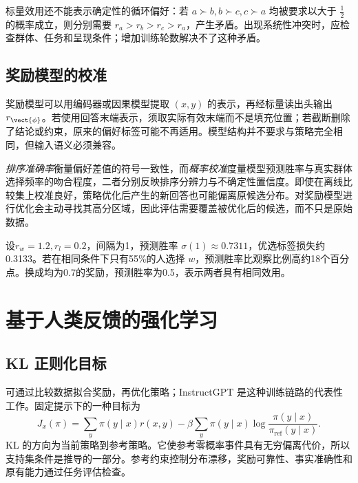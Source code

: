\documentclass[../textbook.tex]{subfiles}
\begin{document}
标量效用还不能表示确定性的循环偏好：若 $a\succ b,b\succ c,c\succ a$ 均被要求以大于 $\frac{1}{2}$ 的概率成立，则分别需要 $r_a>r_b>r_c>r_a$，产生矛盾。出现系统性冲突时，应检查群体、任务和呈现条件；增加训练轮数解决不了这种矛盾。

\subsection{奖励模型的校准}
奖励模型可以用编码器或因果模型提取 $(x,y)$ 的表示，再经标量读出头输出 $r_{\vect{\phi}}$。若使用回答末端表示，须取实际有效末端而不是填充位置；若截断删除了结论或约束，原来的偏好标签可能不再适用。模型结构并不要求与策略完全相同，但输入语义必须兼容。

\emph{排序准确率}衡量偏好差值的符号一致性，而\emph{概率校准}度量模型预测胜率与真实群体选择频率的吻合程度，二者分别反映排序分辨力与不确定性置信度。即使在离线比较集上校准良好，策略优化后产生的新回答也可能偏离原候选分布。对奖励模型进行优化会主动寻找其高分区域，因此评估需要覆盖被优化后的候选，而不只是原始数据。

设$r_w=1.2,r_l=0.2$，间隔为1，预测胜率 $\sigma(1)\approx0.7311$，优选标签损失约0.3133。若在相同条件下只有55\%的人选择 $w$，预测胜率比观察比例高约18个百分点。换成均为0.7的奖励，预测胜率为0.5，表示两者具有相同效用。

\section{基于人类反馈的强化学习}

\subsection{KL 正则化目标}
可通过比较数据拟合奖励，再优化策略；InstructGPT 是这种训练链路的代表性工作\autocite{ouyang2022instructgpt}。固定提示下的一种目标为
\begin{equation}
 J_x(\pi)=\sum_y\pi(y\mid x)r(x,y)
 -\beta\sum_y\pi(y\mid x)\log\frac{\pi(y\mid x)}{\pi_{\mathrm{ref}}(y\mid x)}.
 \label{eq:pref-regularized}
\end{equation}
KL 的方向为当前策略到参考策略。它使参考零概率事件具有无穷偏离代价，所以支持集条件是推导的一部分。参考约束控制分布漂移，奖励可靠性、事实准确性和原有能力通过任务评估检查。
\end{document}

